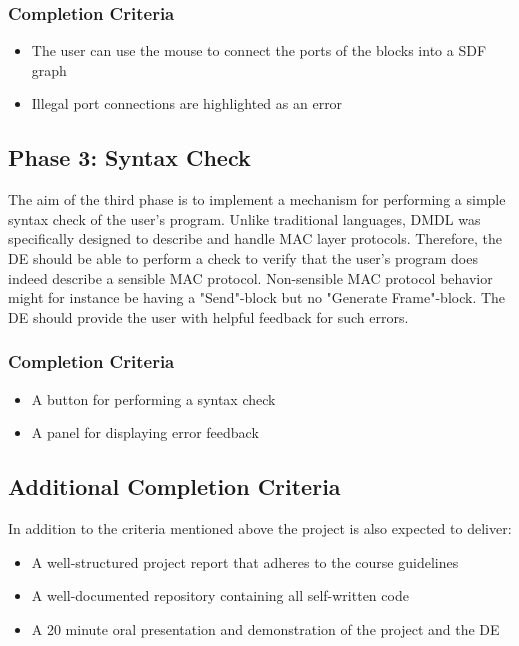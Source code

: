 \documentclass[12pt,twoside]{article}
\begin{document}
\subsubsection{Completion Criteria}
\begin{itemize}[label={\checkmark}]
\item The user can use the mouse to connect the ports of the blocks into a SDF graph
\item Illegal port connections are highlighted as an error
\end{itemize}

\subsection{Phase 3: Syntax Check}
The aim of the third phase is to implement a mechanism for performing a simple syntax check of the user's program.
Unlike traditional languages, DMDL was specifically designed to describe and handle MAC
layer protocols. Therefore, the DE should be able to perform a check to verify that the user's program does indeed describe a sensible MAC
protocol. Non-sensible MAC protocol behavior might for instance be having a "Send"-block but no "Generate Frame"-block. The DE
should provide the user with helpful feedback for such errors. 
\subsubsection{Completion Criteria}
\begin{itemize}[label={\checkmark}]
\item A button for performing a syntax check 
\item A panel for displaying error feedback
\end{itemize}

\subsection{Additional Completion Criteria}
In addition to the criteria mentioned above the project is also expected to deliver:
\begin{itemize}[label={\checkmark}]
\item A well-structured project report that adheres to the course guidelines
\item A well-documented repository containing all self-written code
\item A 20 minute oral presentation and demonstration of the project and the DE
\end{itemize}
\end{document}
